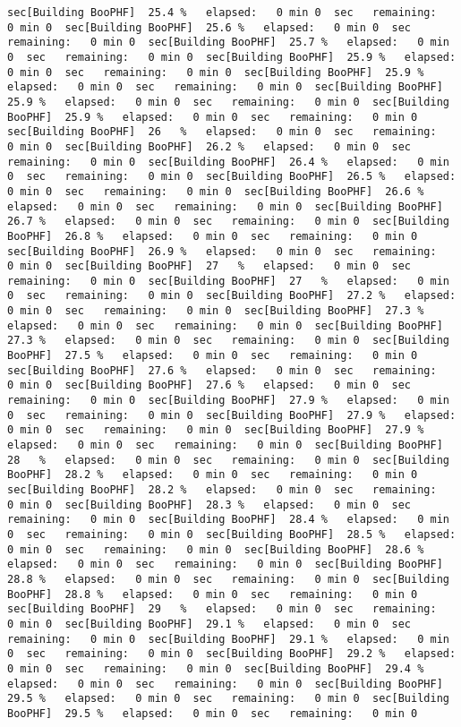 \documentclass[
]{book}
\begin{document}
\begin{verbatim}
sec[Building BooPHF]  25.4 %   elapsed:   0 min 0  sec   remaining:   0 min 0  sec[Building BooPHF]  25.6 %   elapsed:   0 min 0  sec   remaining:   0 min 0  sec[Building BooPHF]  25.7 %   elapsed:   0 min 0  sec   remaining:   0 min 0  sec[Building BooPHF]  25.9 %   elapsed:   0 min 0  sec   remaining:   0 min 0  sec[Building BooPHF]  25.9 %   elapsed:   0 min 0  sec   remaining:   0 min 0  sec[Building BooPHF]  25.9 %   elapsed:   0 min 0  sec   remaining:   0 min 0  sec[Building BooPHF]  25.9 %   elapsed:   0 min 0  sec   remaining:   0 min 0  sec[Building BooPHF]  26   %   elapsed:   0 min 0  sec   remaining:   0 min 0  sec[Building BooPHF]  26.2 %   elapsed:   0 min 0  sec   remaining:   0 min 0  sec[Building BooPHF]  26.4 %   elapsed:   0 min 0  sec   remaining:   0 min 0  sec[Building BooPHF]  26.5 %   elapsed:   0 min 0  sec   remaining:   0 min 0  sec[Building BooPHF]  26.6 %   elapsed:   0 min 0  sec   remaining:   0 min 0  sec[Building BooPHF]  26.7 %   elapsed:   0 min 0  sec   remaining:   0 min 0  sec[Building BooPHF]  26.8 %   elapsed:   0 min 0  sec   remaining:   0 min 0  sec[Building BooPHF]  26.9 %   elapsed:   0 min 0  sec   remaining:   0 min 0  sec[Building BooPHF]  27   %   elapsed:   0 min 0  sec   remaining:   0 min 0  sec[Building BooPHF]  27   %   elapsed:   0 min 0  sec   remaining:   0 min 0  sec[Building BooPHF]  27.2 %   elapsed:   0 min 0  sec   remaining:   0 min 0  sec[Building BooPHF]  27.3 %   elapsed:   0 min 0  sec   remaining:   0 min 0  sec[Building BooPHF]  27.3 %   elapsed:   0 min 0  sec   remaining:   0 min 0  sec[Building BooPHF]  27.5 %   elapsed:   0 min 0  sec   remaining:   0 min 0  sec[Building BooPHF]  27.6 %   elapsed:   0 min 0  sec   remaining:   0 min 0  sec[Building BooPHF]  27.6 %   elapsed:   0 min 0  sec   remaining:   0 min 0  sec[Building BooPHF]  27.9 %   elapsed:   0 min 0  sec   remaining:   0 min 0  sec[Building BooPHF]  27.9 %   elapsed:   0 min 0  sec   remaining:   0 min 0  sec[Building BooPHF]  27.9 %   elapsed:   0 min 0  sec   remaining:   0 min 0  sec[Building BooPHF]  28   %   elapsed:   0 min 0  sec   remaining:   0 min 0  sec[Building BooPHF]  28.2 %   elapsed:   0 min 0  sec   remaining:   0 min 0  sec[Building BooPHF]  28.2 %   elapsed:   0 min 0  sec   remaining:   0 min 0  sec[Building BooPHF]  28.3 %   elapsed:   0 min 0  sec   remaining:   0 min 0  sec[Building BooPHF]  28.4 %   elapsed:   0 min 0  sec   remaining:   0 min 0  sec[Building BooPHF]  28.5 %   elapsed:   0 min 0  sec   remaining:   0 min 0  sec[Building BooPHF]  28.6 %   elapsed:   0 min 0  sec   remaining:   0 min 0  sec[Building BooPHF]  28.8 %   elapsed:   0 min 0  sec   remaining:   0 min 0  sec[Building BooPHF]  28.8 %   elapsed:   0 min 0  sec   remaining:   0 min 0  sec[Building BooPHF]  29   %   elapsed:   0 min 0  sec   remaining:   0 min 0  sec[Building BooPHF]  29.1 %   elapsed:   0 min 0  sec   remaining:   0 min 0  sec[Building BooPHF]  29.1 %   elapsed:   0 min 0  sec   remaining:   0 min 0  sec[Building BooPHF]  29.2 %   elapsed:   0 min 0  sec   remaining:   0 min 0  sec[Building BooPHF]  29.4 %   elapsed:   0 min 0  sec   remaining:   0 min 0  sec[Building BooPHF]  29.5 %   elapsed:   0 min 0  sec   remaining:   0 min 0  sec[Building BooPHF]  29.5 %   elapsed:   0 min 0  sec   remaining:   0 min 0  
\end{verbatim}
\end{document}
